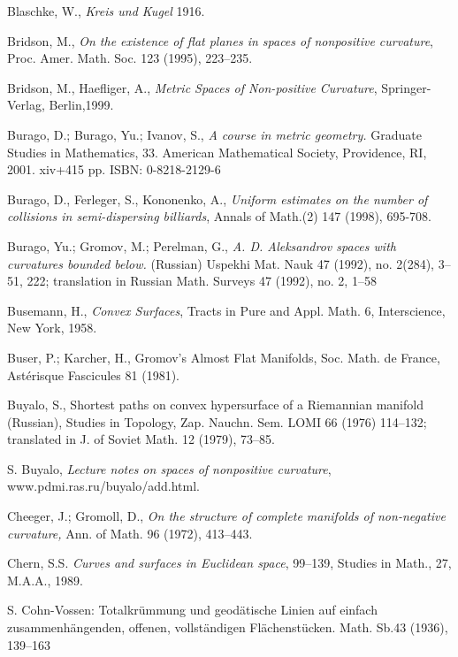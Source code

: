 \begin{thebibliography}{52}
 Blaschke, W., \textit{Kreis und Kugel} 1916.

Bridson, M.,
\textit{On the existence of flat planes in spaces of nonpositive curvature},
Proc. Amer. Math. Soc. 123 (1995), 223--235.

Bridson, M., Haefliger, A.,
\textit{Metric Spaces of Non-positive Curvature},
Springer-Verlag, Berlin,1999.



 Burago, D.; Burago, Yu.; Ivanov, S., \textit{A course in metric geometry.} Graduate Studies in Mathematics, 33. American Mathematical Society, Providence, RI, 2001. xiv+415 pp. ISBN: 0-8218-2129-6

Burago, D., Ferleger, S., Kononenko, A.,
\textit{Uniform estimates on the number of collisions in semi-dispersing
billiards},
Annals of Math.(2) 147 (1998), 695-708.


 Burago, Yu.; Gromov, M.; Perelman, G., \textit{A. D. Aleksandrov spaces
with curvatures bounded below.} (Russian)  Uspekhi Mat. Nauk  47  (1992),  no.
2(284), 3--51, 222;  translation in  Russian Math. Surveys  47  (1992),  no. 2, 1--58

 Busemann, H., \textit{Convex Surfaces}, Tracts in Pure and Appl. Math. 6, Interscience, New York, 1958.

 Buser, P.; Karcher, H.,
Gromov's Almost Flat Manifolds,
Soc. Math. de France, Ast\'erisque Fascicules
81 (1981). 

 Buyalo, S., Shortest paths on convex
hypersurface of a Riemannian manifold (Russian), Studies in Topology, Zap. Nauchn. Sem.
LOMI 66 (1976) 114--132; translated in J. of Soviet Math. 12 (1979), 73--85.

S. Buyalo,
{\em Lecture notes on spaces of nonpositive curvature},
www.pdmi.ras.ru/buyalo/add.html.


  Cheeger, J.;  Gromoll, D., \textit{On the structure of complete manifolds of non-negative curvature,} Ann. of Math. 96 (1972), 413--443.

  Chern, S.S. \textit{Curves and surfaces in Euclidean space},  99--139,  Studies in Math., 27, M.A.A., 1989.

 S. Cohn-Vossen: Totalkr\"ummung und geod\"atische Linien auf einfach zusammenh\"angenden, offenen, vollst\"andigen Fl\"achenst\"ucken. Math. Sb.43 (1936), 139--163


\end{thebibliography}
